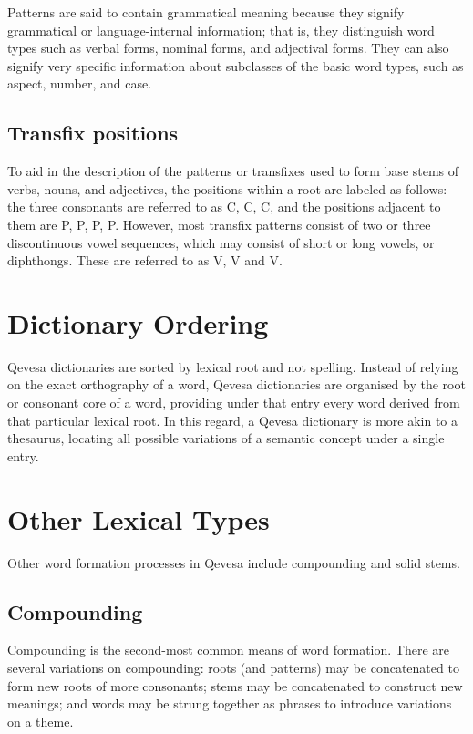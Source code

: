 \documentclass[grammar]{subfiles}
\begin{document}
  Patterns are said to contain grammatical meaning because they signify grammatical or language-internal information; that is, they distinguish word types such as verbal forms, nominal forms, and adjectival forms.  They can also signify very specific information about subclasses of the basic word types, such as aspect, number, and case.

  \subsection{Transfix positions}
  \label{ssec:mt_transfix_positions}

  To aid in the description of the patterns or transfixes used to form base stems of verbs, nouns, and adjectives, the positions within a root are labeled as follows: the three consonants are referred to as C, C, C, and the positions adjacent to them are P, P, P, P.
  However, most transfix patterns consist of two or three discontinuous vowel sequences, which may consist of short or long vowels, or diphthongs.  These are referred to as V, V and V. 

  \section{Dictionary Ordering}
  \label{sec:mt_dictionary_ordering}

  Qevesa dictionaries are sorted by lexical root and not spelling.  Instead of relying on the exact orthography of a word, Qevesa dictionaries are organised by the root or consonant core of a word, providing under that entry every word derived from that particular lexical root.  In this regard, a Qevesa dictionary is more akin to a thesaurus, locating all possible variations of a semantic concept under a single entry.

  \section{Other Lexical Types}
  \label{sec:mt_other_lexical_types}

  Other word formation processes in Qevesa include compounding and solid stems.

  \subsection{Compounding}
  \label{ssec:mt_morph_compounding}

  Compounding is the second-most common means of word formation.  There are several variations on compounding: roots (and patterns) may be concatenated to form new roots of more consonants; stems may be concatenated to construct new meanings; and words may be strung together as phrases to introduce variations on a theme.
\end{document}

